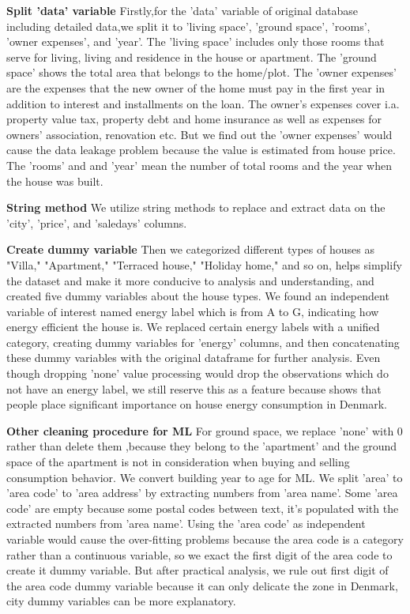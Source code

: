 \documentclass[12pt]{article} %
\begin{document}
{        \textbf{Split 'data' variable}
        Firstly,for the 'data' variable of original database including detailed data,we split it to 'living space', 'ground space', 'rooms', 'owner expenses', and 'year'. The 'living space' includes only those rooms that serve for living, living and residence in the house or apartment. The 'ground space' shows the total area that belongs to the home/plot. The 'owner expenses' are the expenses that the new owner of the home must pay in the first year in addition to interest and installments on the loan. The owner's expenses cover i.a. property value tax, property debt and home insurance as well as expenses for owners' association, renovation etc. But we find out the 'owner expenses' would cause the data leakage problem because the value is estimated from house price. The 'rooms' and and 'year' mean the number of total rooms and the year when the house was built.\par
        
        \textbf{String method}
        We utilize string methods to replace and extract data on the 'city', 'price', and 'saledays' columns.
        
        \textbf{Create dummy variable}
        Then we categorized different types of houses as "Villa," "Apartment," "Terraced house," "Holiday home," and so on, helps simplify the dataset and make it more conducive to analysis and understanding, and created five dummy variables about the house types. We found an independent variable of interest named energy label which is from A to G, indicating how energy efficient the house is. We replaced certain energy labels with a unified category, creating dummy variables for 'energy' columns, and then concatenating these dummy variables with the original dataframe for further analysis. Even though dropping 'none' value processing would drop the observations which do not have an energy label, we still reserve this as a feature because \cite{marshetal2010} shows that people place significant importance on house energy consumption in Denmark. 
        
        \textbf{Other cleaning procedure for ML} For ground space, we replace 'none' with 0 rather than delete them ,because they belong to the 'apartment' and the ground space of the apartment is not in consideration when buying and selling consumption behavior. We convert building year to age for ML. We split 'area' to 'area code' to 'area address' by extracting numbers from 'area name'. Some 'area code' are empty because some postal codes between text, it's populated with the extracted numbers from 'area name'. Using the 'area code' as independent variable would cause the over-fitting problems because the area code is a category rather than a continuous variable, so we exact the first digit of the area code to create it dummy variable. But after practical analysis, we rule out first digit of the area code dummy variable because it can only delicate the zone in Denmark, city dummy variables can be more explanatory. \par

}
\end{document}
